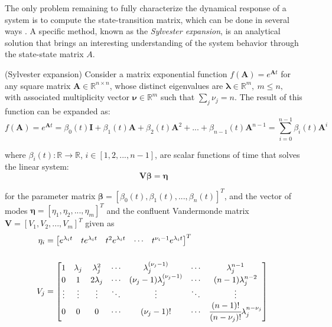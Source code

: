 \documentclass[a4paper,11pt]{book}
\numberwithin{figure}{chapter}
\numberwithin{equation}{chapter}
\numberwithin{table}{chapter}
\newtheorem{theorem}{Theorem}[chapter]
\theoremstyle{definition}
\newcounter{boxed-theorem}
\newenvironment{boxed-theorem}[1]
{\begin{shaded} \begin{theorem}{#1}}
{\end{theorem} \end{shaded}}
\newcounter{boxed-definition}
\begin{document}
The only problem remaining to fully characterize the dynamical response of a system is to compute the state-transition matrix, which can be done in several ways \cite{Moler_VanLoan:2003}. A specific method, known as the \textit{Sylvester expansion}, is an analytical solution that brings an interesting understanding of the system behavior through the state-state matrix $A$.

\begin{boxed-theorem}{(Sylvester expansion)} \label{th:sylvester01}
    Consider a matrix exponential function $f(\bm{A}) = e^{\bm{A} t}$ for any square matrix $\bm{A} \in \mathbb{R}^{n \times n}$, whose distinct eigenvalues are $\bm{\lambda} \in \mathbb{R}^{m},\ m \leq n,$ with associated multiplicity vector $\bm{\nu} \in \mathbb{R}^m$ such that $\sum_j \nu_j = n$. The result of this function can be expanded as:
    \begin{equation} \label{eq:sylvester01}
        f(\bm{A}) = e^{\bm{A} t} = \beta_0(t) \bm{I} + \beta_1(t) \bm{A} + \beta_2(t) \bm{A}^2 + ... + \beta_{n-1}(t) \bm{A}^{n-1} = \sum_{i=0}^{n-1} \beta_i(t) \bm{A}^i
    \end{equation} 
    
    \noindent where $\beta_i(t) : \mathbb{R} \rightarrow \mathbb{R}$, $i \in [1,2,...,n-1]$, are scalar functions of time that solves the linear system:
    \begin{equation} \label{eq:sylvester02}
        \bm{V} \bm{\beta} = \bm{\eta}
    \end{equation} 
    
    \noindent for the parameter matrix $\bm{\beta} = [\beta_0(t), \beta_1(t), ..., \beta_n(t)]^T$, and the vector of modes $\bm{\eta} = [\eta_1, \eta_2, ..., \eta_m]^T$ and the confluent Vandermonde matrix $\bm{V} = [V_1, V_2, ..., V_m]^T$ given as
    \begin{align*}
	    \eta_i & = \begin{bmatrix} e^{\lambda_i t} & te^{\lambda_i t} & t^2e^{\lambda_i t} & \cdots & t^{\nu_i-1}e^{\lambda_i t} \end{bmatrix}^T \\ \\
    	V_j 	& = \begin{bmatrix}
            1 & \lambda_j & \lambda_j^2 & \cdots & \lambda_j^{(\nu_j - 1)} & \cdots & \lambda_j^{n-1} \\
            0 & 1 & 2\lambda_j & \cdots & (\nu_j - 1) \lambda_j^{(\nu_j - 1)} & \cdots & (n-1)\lambda_j^{n-2} \\
            \vdots & \vdots & \vdots & \ddots & \vdots & \ddots & \vdots \\
            0 & 0 & 0 & \cdots & (\nu_j - 1)! & \cdots & \cfrac{(n - 1)!}{(n - \nu_j)!}\lambda_j^{n-\nu_j} \\
        \end{bmatrix}\
    \end{align*} 
\end{boxed-theorem}
\end{document}
